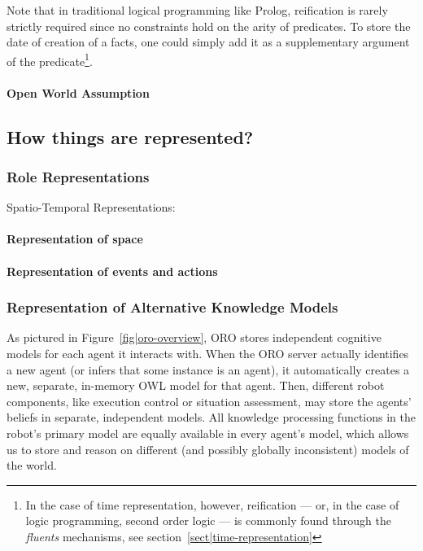 Note that in traditional logical programming like Prolog, reification is rarely
strictly required since no constraints hold on the arity of predicates. To
store the date of creation of a facts, one could simply add it as a
supplementary argument of the predicate\footnote{In the case of time
representation, however, reification --- or, in the case of logic programming,
second order logic --- is commonly found through the \emph{fluents} mechanisms,
see section~\ref{sect|time-representation}}.

\paragraph{Open World Assumption}

\subsection{How things are represented?}

\subsubsection{Role Representations}
Spatio-Temporal Representations:

\paragraph{Representation of space}
\paragraph{Representation of events and actions}


\subsubsection{Representation of Alternative Knowledge Models}
\label{sect|alterite}

As pictured in Figure~\ref{fig|oro-overview}, ORO stores independent cognitive
models for each agent it interacts with. When the ORO server actually
identifies a new agent (or infers that some instance is an agent), it
automatically creates a new, separate, in-memory OWL model for that agent.
Then, different robot components, like execution control or situation
assessment, may store the agents' beliefs in separate, independent models. All
knowledge processing functions in the robot's primary model are equally
available in every agent's model, which allows us to store and reason on
different (and possibly globally inconsistent) models of the world.

